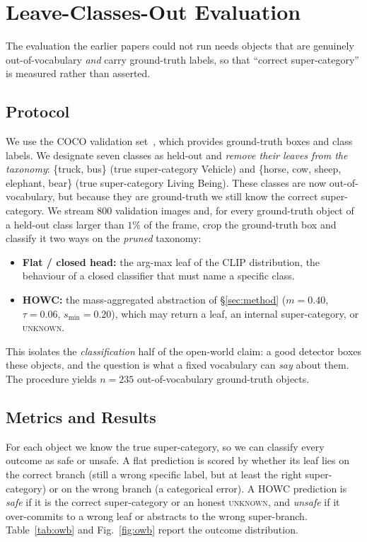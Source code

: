 \documentclass[conference]{IEEEtran}
\begin{document}
\section{Leave-Classes-Out Evaluation}
\label{sec:benchmark}
The evaluation the earlier papers could not run needs objects that are genuinely
out-of-vocabulary \emph{and} carry ground-truth labels, so that ``correct
super-category'' is measured rather than asserted.

\subsection{Protocol}
We use the COCO validation set~\cite{lin2014coco}, which provides ground-truth boxes
and class labels. We designate seven classes as held-out and \emph{remove their
leaves from the taxonomy}: \{truck, bus\} (true super-category Vehicle) and \{horse,
cow, sheep, elephant, bear\} (true super-category Living Being). These classes are
now out-of-vocabulary, but because they are ground-truth we still know the correct
super-category. We stream $800$ validation images and, for every ground-truth object
of a held-out class larger than $1\%$ of the frame, crop the ground-truth box and
classify it two ways on the \emph{pruned} taxonomy:
\begin{itemize}
\item \textbf{Flat / closed head:} the arg-max leaf of the CLIP distribution, the
behaviour of a closed classifier that must name a specific class.
\item \textbf{HOWC:} the mass-aggregated abstraction of \S\ref{sec:method}
($m=0.40$, $\tau=0.06$, $s_{\min}=0.20$), which may return a leaf, an internal
super-category, or \textsc{unknown}.
\end{itemize}
This isolates the \emph{classification} half of the open-world claim: a good
detector boxes these objects, and the question is what a fixed vocabulary can
\emph{say} about them. The procedure yields $n=235$ out-of-vocabulary ground-truth
objects.

\subsection{Metrics and Results}
For each object we know the true super-category, so we can classify every outcome as
safe or unsafe. A flat prediction is scored by whether its leaf lies on the correct
branch (still a wrong specific label, but at least the right super-category) or on
the wrong branch (a categorical error). A HOWC prediction is \emph{safe} if it is
the correct super-category or an honest \textsc{unknown}, and \emph{unsafe} if it
over-commits to a wrong leaf or abstracts to the wrong super-branch.
Table~\ref{tab:owb} and Fig.~\ref{fig:owb} report the outcome distribution.
\end{document}

